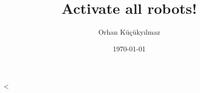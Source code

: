 \documentclass[twopages]{scrartcl}
\begin{document}
\title{Activate all robots!}
\author{Orhan Küçükyılmaz}
\date{\today}
\maketitle
\newpage
<%
\end{document}
